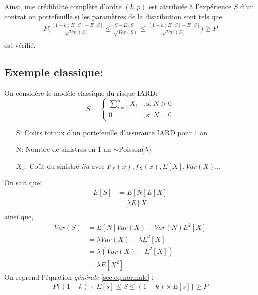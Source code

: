 Ainsi, une crédibilité complète d'ordre $(k,p)$ est attribuée à l'expérience $S$ d'un contrat ou portefeuille si les paramètres de la distribution sont tels que 
\begin{align*}
P\Bigg( \frac{(1 - k)E[S] - E[S]}{\sqrt{Var(S)}} \leq \frac{S - E[S]}{\sqrt{Var(S)}} \leq \frac{(1 + k)E[S] - E[S]}{\sqrt{Var(S)}}\Bigg) \geq P \\
\end{align*}
est vérifié.
\subsection{Exemple classique:}
On considère le modèle classique du risque IARD:
\begin{equation}
	S =
     \left\{
     \begin{array}{rl}
      \sum_{i = 1}^{n} X_{i} &, \text{si } N > 0 \\
      0 &, \text{si }N = 0
     \end{array}
     \right.
\end{equation}
\begin{itemize}
\item[S:] Coûts totaux d'un portefeuille d'assurance IARD pour 1 an
\item[N:] Nombre de sinistres en 1 an $ \sim$Poisson($\lambda$)
\item[$X_i:$] Coût du sinistre \emph{iid} avec $F_X(x),f_X(x), E[X], Var(X)...$
\end{itemize}
On sait que:
\begin{align*}
E[S] &= E[N] E[X] \\
&= \lambda E[X]\\
\end{align*}
ainsi que,
\begin{align*}
Var(S) &= E[N]Var(X) + Var(N)E^{2}[X]\\
&= \lambda Var(X) + \lambda E^{2}[X]\\
&= \lambda (Var(X) + E^{2}[X])\\
&= \lambda E[X^2]
\end{align*} 
On reprend l'équation \emph{générale} \ref{sec:eq:normale} :
\begin{align*}
P \Big \lbrace(1 - k) \times E[s] \leq S \leq(1 + k)\times E[s]\Big\rbrace \geq P
\end{align*}

